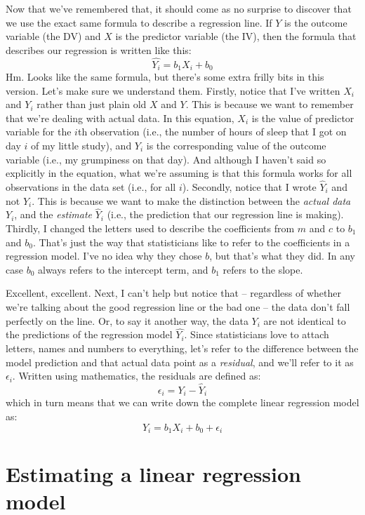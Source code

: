 Now that we've remembered that, it should come as no surprise to discover that we use the exact same formula to describe a regression line. If $Y$ is the outcome variable (the DV) and $X$ is the predictor variable (the IV), then the formula that describes our regression is written like this:
$$
\hat{Y_i} = b_1 X_i + b_0
$$
Hm. Looks like the same formula, but there's some extra frilly bits in this version. Let's make sure we understand them. Firstly, notice that I've written $X_i$ and $Y_i$ rather than just plain old $X$ and $Y$. This is because we want to remember that we're dealing with actual data. In this equation, $X_i$ is the value of predictor variable for the $i$th observation (i.e., the number of hours of sleep that I got on day $i$ of my little study), and $Y_i$ is the corresponding value of the outcome variable (i.e., my grumpiness on that day). And although I haven't said so explicitly in the equation, what we're assuming is that this formula works for all observations in the data set (i.e., for all $i$). Secondly, notice that I wrote $\hat{Y}_i$ and not $Y_i$. This is because we want to make the distinction between the {\it actual data} $Y_i$, and the {\it estimate} $\hat{Y}_i$ (i.e., the prediction that our regression line is making). Thirdly, I changed the letters used to describe the coefficients from $m$ and $c$ to $b_1$ and $b_0$. That's just the way that statisticians like to refer to the coefficients in a regression model. I've no idea why they chose $b$, but that's what they did. In any case $b_0$ always refers to the intercept term, and $b_1$ refers to the slope.

Excellent, excellent. Next, I can't help but notice that -- regardless of whether we're talking about the good regression line or the bad one -- the data don't fall perfectly on the line. Or, to say it another way, the data $Y_i$ are not identical to the predictions of the regression model $\hat{Y_i}$. Since statisticians love to attach letters, names and numbers to everything, let's refer to the difference between the model prediction and that actual data point as a {\it residual}, and we'll refer to it as $\epsilon_i$. Written using mathematics, the residuals are defined as:
$$
\epsilon_i = Y_i - \hat{Y}_i
$$
which in turn means that we can write down the complete linear regression model as:
$$
Y_i = b_1 X_i + b_0 + \epsilon_i
$$


\section{Estimating a linear regression model~\label{sec:regressionestimation}}


